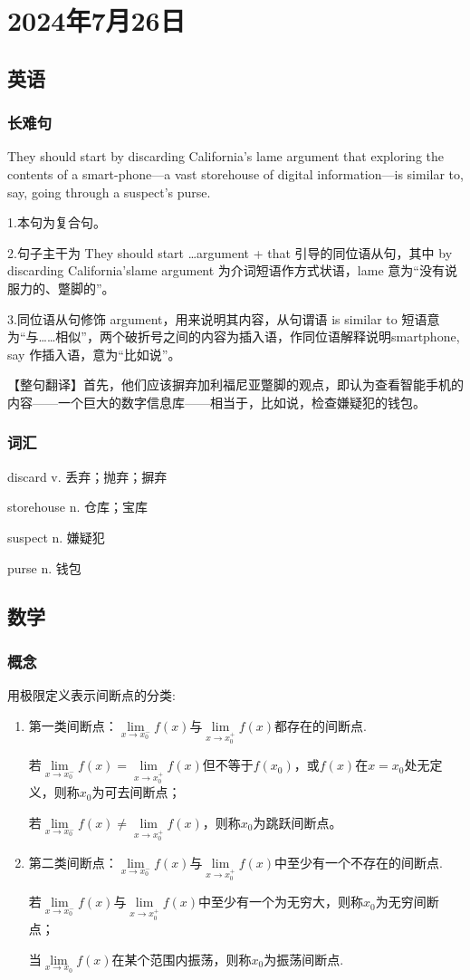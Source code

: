 \documentclass[UTF8]{ctexart}
\begin{document}
\section{2024年7月26日}
\subsection{英语}
\subsubsection{长难句}
They should start by discarding California's lame argument that exploring the contents of a smart-phone---a vast storehouse of digital information---is similar to, say, going through a suspect's purse.

1.本句为复合句。

2.句子主干为 They should start …argument + that 引导的同位语从句，其中 by discarding California’slame argument 为介词短语作方式状语，lame 意为“没有说
服力的、蹩脚的”。

3.同位语从句修饰 argument，用来说明其内容，从句谓语 is similar to 短语意为“与……相似”，两个破折号之间的内容为插入语，作同位语解释说明smartphone, say 作插入语，意为“比如说”。

【整句翻译】首先，他们应该摒弃加利福尼亚蹩脚的观点，即认为查看智能手机的内容——一个巨大的数字信息库——相当于，比如说，检查嫌疑犯的钱包。
\subsubsection{词汇}
discard v. 丢弃；抛弃；摒弃

storehouse n. 仓库；宝库

suspect n. 嫌疑犯

purse n. 钱包
\subsection{数学}
\subsubsection{概念}
用极限定义表示间断点的分类:
\begin{enumerate}
      \item 第一类间断点：$\lim\limits_{x \to x^{-}_{0}}f(x)$与$\lim\limits_{x \to x^{+}_{0}}f(x)$都存在的间断点.

            若$\lim\limits_{x \to x^{-}_{0}}f(x)=\lim\limits_{x \to x^{+}_{0}}f(x)$但不等于$f(x_0)$，或$f(x)$在$x=x_0$处无定义，则称$x_0$为可去间断点；

            若$\lim\limits_{x \to x^{-}_{0}}f(x)\ne\lim\limits_{x \to x^{+}_{0}}f(x)$，则称$x_0$为跳跃间断点。
      \item 第二类间断点：$\lim\limits_{x \to x^{-}_{0}}f(x)$与$\lim\limits_{x \to x^{+}_{0}}f(x)$中至少有一个不存在的间断点.

            若$\lim\limits_{x \to x^{-}_{0}}f(x)$与$\lim\limits_{x \to x^{+}_{0}}f(x)$中至少有一个为无穷大，则称$x_0$为无穷间断点；

            当$\lim\limits_{x \to x_{0}}f(x)$在某个范围内振荡，则称$x_0$为振荡间断点.

\end{enumerate}
\end{document}
